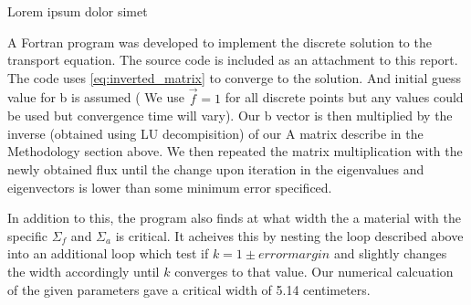 \documentclass[../main.tex]{subfiles}
\begin{document}
Lorem ipsum dolor simet

A Fortran program was developed to implement the discrete solution to the transport equation. The source code is included as an attachment to this report. The code uses \eqref{eq:inverted_matrix} to converge to the solution. And initial guess value for b is assumed ( We use $\overrightarrow{f}=1$ for all discrete points but any values could be used but convergence time will vary). Our b vector is then multiplied by the inverse (obtained using LU decompisition) of our A matrix describe in the Methodology section above. We then repeated the matrix multiplication with the newly obtained flux until the change upon iteration in the eigenvalues and eigenvectors is lower than some minimum error specificed.


In addition to this, the program also finds at what width the a material with the specific $\Sigma_f$ and $\Sigma_a$ is critical. It acheives this by nesting the loop described above into an additional loop which test if $k = 1 \pm error margin$  and slightly changes the width accordingly until $k$ converges to that value. Our numerical calcuation of the given parameters gave a critical width of 5.14 centimeters. 
	
\end{document}

